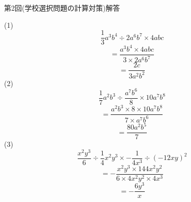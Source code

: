\documentclass{jarticle}
\begin{document}
\begin{center}
第2回(学校選択問題の計算対策)解答
\end{center}
(1)
\[\frac{1}{3}a^{3}b^{4}÷2a^{6}b^{7}×4abc\]
\[=\frac{a^{3}b^{4}×4abc}{3×2a^{6}b^{7}}\]
\[=\frac{2c}{3a^{2}b^{2}}\]
(2)
\[\frac{1}{7}a^{2}b^{3}÷\frac{a^{7}b^{6}}{8}×10a^{7}b^{8}\]
\[=\frac{a^{2}b^{3}×8×10a^{7}b^{8}}{7×a^{7}b^{6}}\]
\[=\frac{80a^{2}b^{5}}{7}\]
(3)
\[\frac{x^{2}y^{3}}{6}÷\frac{1}{4}x^{2}y^{3}×-\frac{1}{4x^{3}}÷(-12xy)^{2}\]
\[=-\frac{x^{2}y^{3}×144x^{2}y^{2}}{6×4x^{2}y^{2}×4x^{3}}\]
\[=-\frac{6y^{3}}{x}\]
\end{document}
